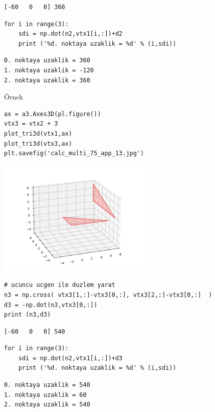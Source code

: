 \documentclass[12pt,fleqn]{article}\usepackage{../../common}
\begin{document}
\begin{verbatim}
[-60   0   0] 360
\end{verbatim}

\begin{verbatim}
for i in range(3):
    sdi = np.dot(n2,vtx1[i,:])+d2
    print ('%d. noktaya uzaklik = %d' % (i,sdi))
\end{verbatim}

\begin{verbatim}
0. noktaya uzaklik = 360
1. noktaya uzaklik = -120
2. noktaya uzaklik = 360
\end{verbatim}

Örnek

\begin{verbatim}
ax = a3.Axes3D(pl.figure())
vtx3 = vtx2 + 3
plot_tri3d(vtx1,ax)
plot_tri3d(vtx3,ax)
plt.savefig('calc_multi_75_app_13.jpg')
\end{verbatim}

\includegraphics[width=20em]{calc_multi_75_app_13.jpg}

\begin{verbatim}
# ucuncu ucgen ile duzlem yarat
n3 = np.cross( vtx3[1,:]-vtx3[0,:], vtx3[2,:]-vtx3[0,:]  )
d3 = -np.dot(n3,vtx3[0,:])
print (n3,d3)
\end{verbatim}

\begin{verbatim}
[-60   0   0] 540
\end{verbatim}

\begin{verbatim}
for i in range(3):
    sdi = np.dot(n2,vtx1[i,:])+d3
    print ('%d. noktaya uzaklik = %d' % (i,sdi))
\end{verbatim}

\begin{verbatim}
0. noktaya uzaklik = 540
1. noktaya uzaklik = 60
2. noktaya uzaklik = 540
\end{verbatim}
\end{document}
